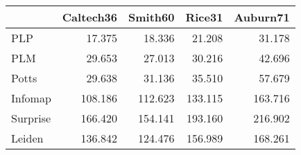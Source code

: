 \begin{tabular}{lrrrr}
\toprule
{} & Caltech36 & Smith60 &  Rice31 & Auburn71 \\
\midrule
PLP      &    17.375 &  18.336 &  21.208 &   31.178 \\
PLM      &    29.653 &  27.013 &  30.216 &   42.696 \\
Potts    &    29.638 &  31.136 &  35.510 &   57.679 \\
Infomap  &   108.186 & 112.623 & 133.115 &  163.716 \\
Surprise &   166.420 & 154.141 & 193.160 &  216.902 \\
Leiden   &   136.842 & 124.476 & 156.989 &  168.261 \\
\bottomrule
\end{tabular}
